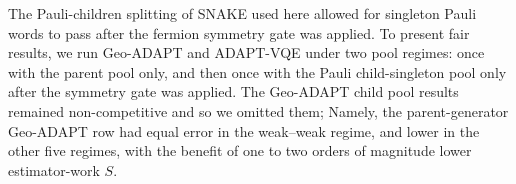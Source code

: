 \documentclass[
  reprint,
  amsmath,
  amssymb,
  aps,
  pra,
  nofootinbib,
  superscriptaddress,
  floatfix
]{revtex4-2}
\begin{document}
The Pauli-children splitting of SNAKE used here allowed for singleton Pauli words to pass after the fermion symmetry gate was applied. To present fair results, we run Geo-ADAPT and ADAPT-VQE under two pool regimes: once with the parent pool only, and then once with the Pauli child-singleton pool only after the symmetry gate was applied. The Geo-ADAPT child pool results remained non-competitive and so we omitted them; Namely, the parent-generator Geo-ADAPT row had equal error in the weak--weak regime, and lower in the other five regimes, with the benefit of one to two orders of magnitude lower estimator-work \(S\).

\end{document}
